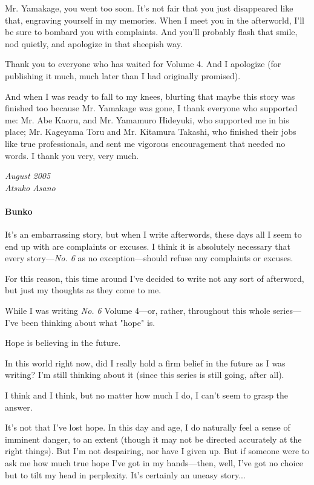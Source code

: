 Mr. Yamakage, you went too soon. It's not fair that you just disappeared
like that, engraving yourself in my memories. When I meet you in the
afterworld, I'll be sure to bombard you with complaints. And you'll
probably flash that smile, nod quietly, and apologize in that sheepish
way.

Thank you to everyone who has waited for Volume 4. And I apologize (for
publishing it much, much later than I had originally promised).

And when I was ready to fall to my knees, blurting that maybe this story
was finished too because Mr. Yamakage was gone, I thank everyone who
supported me: Mr. Abe Kaoru, and Mr. Yamamuro Hideyuki, who supported me
in his place; Mr. Kageyama Toru and Mr. Kitamura Takashi, who finished
their jobs like true professionals, and sent me vigorous encouragement
that needed no words. I thank you very, very much.

\myspace

\emph{August 2005\\
	Atsuko Asano}

\paragraph{Bunko}

It's an embarrassing story, but when I write afterwords, these days all
I seem to end up with are complaints or excuses. I think it is
absolutely necessary that every story---\emph{No. 6} as no exception---should
refuse any complaints or excuses.

For this reason, this time around I've decided to write not any sort of
afterword, but just my thoughts as they come to me.

While I was writing \emph{No. 6} Volume 4---or, rather, throughout this whole
series---I've been thinking about what "hope" is.

Hope is believing in the future.

In this world right now, did I really hold a firm belief in the future
as I was writing? I'm still thinking about it (since this series is
still going, after all).

I think and I think, but no matter how much I do, I can't seem to grasp
the answer.

It's not that I've lost hope. In this day and age, I do naturally feel a
sense of imminent danger, to an extent (though it may not be directed
accurately at the right things). But I'm not despairing, nor have I
given up. But if someone were to ask me how much true hope I've got in
my hands---then, well, I've got no choice but to tilt my head in
perplexity. It's certainly an uneasy story...

